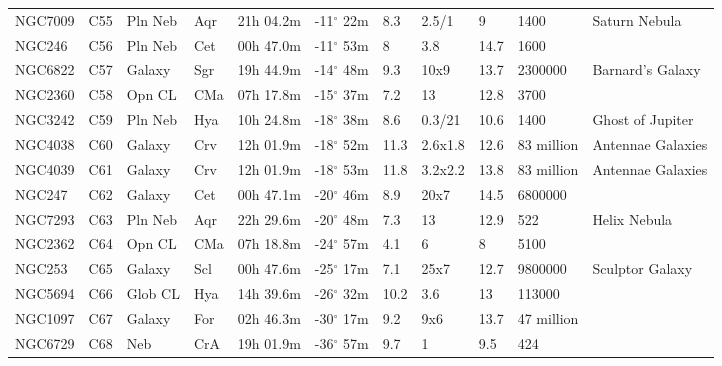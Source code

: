 \begin{longtable}{@{}lllllllllll@{}}
NGC7009    & C55           & Pln Neb & Aqr & 21h 04.2m & -11$^{\circ}$ 22m & 8.3  & 2.5/1          & 9    & 1400          & Saturn Nebula                   \\
NGC246     & C56           & Pln Neb & Cet & 00h 47.0m & -11$^{\circ}$ 53m & 8    & 3.8            & 14.7 & 1600          &                                 \\
NGC6822    & C57           & Galaxy  & Sgr & 19h 44.9m & -14$^{\circ}$ 48m & 9.3  & 10x9           & 13.7 & 2300000       & Barnard's Galaxy                \\
NGC2360    & C58           & Opn CL  & CMa & 07h 17.8m & -15$^{\circ}$ 37m & 7.2  & 13             & 12.8 & 3700          &                                 \\
NGC3242    & C59           & Pln Neb & Hya & 10h 24.8m & -18$^{\circ}$ 38m & 8.6  & 0.3/21         & 10.6 & 1400          & Ghost of Jupiter                \\
NGC4038    & C60           & Galaxy  & Crv & 12h 01.9m & -18$^{\circ}$ 52m & 11.3 & 2.6x1.8        & 12.6 & 83 million    & Antennae Galaxies               \\
NGC4039    & C61           & Galaxy  & Crv & 12h 01.9m & -18$^{\circ}$ 53m & 11.8 & 3.2x2.2        & 13.8 & 83 million    & Antennae Galaxies               \\
NGC247     & C62           & Galaxy  & Cet & 00h 47.1m & -20$^{\circ}$ 46m & 8.9  & 20x7           & 14.5 & 6800000       &                                 \\
NGC7293    & C63           & Pln Neb & Aqr & 22h 29.6m & -20$^{\circ}$ 48m & 7.3  & 13             & 12.9 & 522           & Helix Nebula                    \\
NGC2362    & C64           & Opn CL  & CMa & 07h 18.8m & -24$^{\circ}$ 57m & 4.1  & 6              & 8    & 5100          &                                 \\
NGC253     & C65           & Galaxy  & Scl & 00h 47.6m & -25$^{\circ}$ 17m & 7.1  & 25x7           & 12.7 & 9800000       & Sculptor Galaxy                 \\
NGC5694    & C66           & Glob CL & Hya & 14h 39.6m & -26$^{\circ}$ 32m & 10.2 & 3.6            & 13   & 113000        &                                 \\
NGC1097    & C67           & Galaxy  & For & 02h 46.3m & -30$^{\circ}$ 17m & 9.2  & 9x6            & 13.7 & 47 million    &                                 \\
NGC6729    & C68           & Neb     & CrA & 19h 01.9m & -36$^{\circ}$ 57m & 9.7  & 1              & 9.5  & 424           &                                 \\

\end{longtable}
